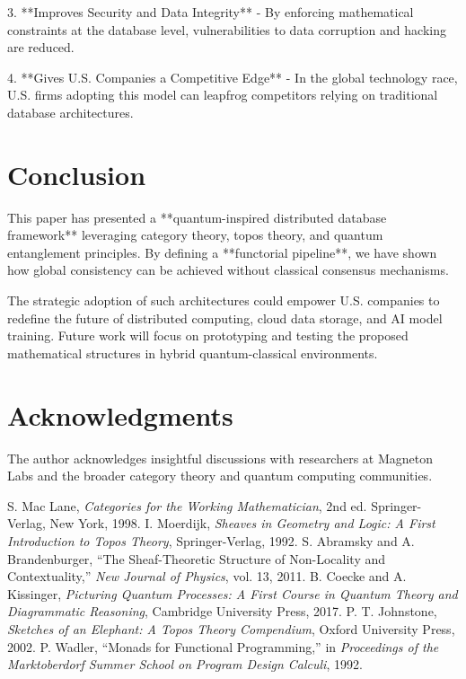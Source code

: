 \documentclass[11pt]{article}
\theoremstyle{remark}
\begin{document}
3. **Improves Security and Data Integrity**  
   - By enforcing mathematical constraints at the database level, vulnerabilities to data corruption and hacking are reduced.

4. **Gives U.S. Companies a Competitive Edge**  
   - In the global technology race, U.S. firms adopting this model can leapfrog competitors relying on traditional database architectures.

\section{Conclusion}
This paper has presented a **quantum-inspired distributed database framework** leveraging category theory, topos theory, and quantum entanglement principles. By defining a **functorial pipeline**, we have shown how global consistency can be achieved without classical consensus mechanisms.

The strategic adoption of such architectures could empower U.S. companies to redefine the future of distributed computing, cloud data storage, and AI model training. Future work will focus on prototyping and testing the proposed mathematical structures in hybrid quantum-classical environments.

\section*{Acknowledgments}
The author acknowledges insightful discussions with researchers at Magneton Labs and the broader category theory and quantum computing communities.

\newpage


\begin{thebibliography}{99}
 S. Mac Lane, \emph{Categories for the Working Mathematician}, 2nd ed. Springer-Verlag, New York, 1998.
 I. Moerdijk, \emph{Sheaves in Geometry and Logic: A First Introduction to Topos Theory}, Springer-Verlag, 1992.
 S. Abramsky and A. Brandenburger, ``The Sheaf-Theoretic Structure of Non-Locality and Contextuality,'' \emph{New Journal of Physics}, vol. 13, 2011.
 B. Coecke and A. Kissinger, \emph{Picturing Quantum Processes: A First Course in Quantum Theory and Diagrammatic Reasoning}, Cambridge University Press, 2017.
 P. T. Johnstone, \emph{Sketches of an Elephant: A Topos Theory Compendium}, Oxford University Press, 2002.
 P. Wadler, ``Monads for Functional Programming,'' in \emph{Proceedings of the Marktoberdorf Summer School on Program Design Calculi}, 1992.
\end{thebibliography}
\end{document}
